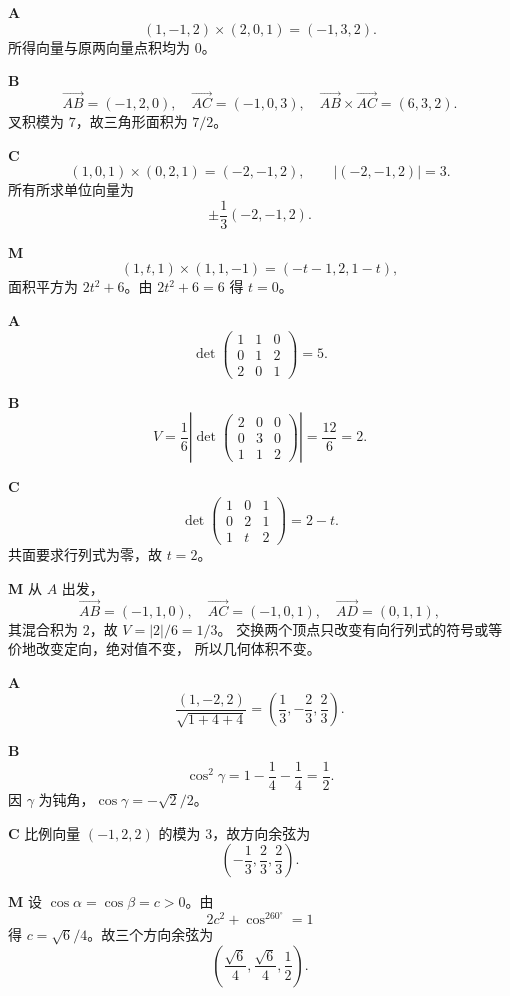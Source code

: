\begin{solutionBox}
\textbf{A}\quad
\[
(1,-1,2)\times(2,0,1)=(-1,3,2).
\]
所得向量与原两向量点积均为 \(0\)。

\textbf{B}\quad
\[
\overrightarrow{AB}=(-1,2,0),\quad
\overrightarrow{AC}=(-1,0,3),\quad
\overrightarrow{AB}\times\overrightarrow{AC}=(6,3,2).
\]
叉积模为 \(7\)，故三角形面积为 \(7/2\)。

\textbf{C}\quad
\[
(1,0,1)\times(0,2,1)=(-2,-1,2),\qquad |(-2,-1,2)|=3.
\]
所有所求单位向量为
\[
\pm\frac13(-2,-1,2).
\]

\textbf{M}\quad
\[
(1,t,1)\times(1,1,-1)=(-t-1,2,1-t),
\]
面积平方为 \(2t^2+6\)。由 \(2t^2+6=6\) 得 \(t=0\)。
\end{solutionBox}

\begin{solutionBox}
\textbf{A}\quad
\[
\det\begin{pmatrix}1&1&0\\0&1&2\\2&0&1\end{pmatrix}=5.
\]

\textbf{B}\quad
\[
V=\frac16\left|
\det\begin{pmatrix}2&0&0\\0&3&0\\1&1&2\end{pmatrix}\right|
=\frac{12}{6}=2.
\]

\textbf{C}\quad
\[
\det\begin{pmatrix}1&0&1\\0&2&1\\1&t&2\end{pmatrix}
=2-t.
\]
共面要求行列式为零，故 \(t=2\)。

\textbf{M}\quad
从 \(A\) 出发，
\[
\overrightarrow{AB}=(-1,1,0),\quad
\overrightarrow{AC}=(-1,0,1),\quad
\overrightarrow{AD}=(0,1,1),
\]
其混合积为 \(2\)，故 \(V=|2|/6=1/3\)。
交换两个顶点只改变有向行列式的符号或等价地改变定向，绝对值不变，
所以几何体积不变。
\end{solutionBox}

\begin{solutionBox}
\textbf{A}\quad
\[
\frac{(1,-2,2)}{\sqrt{1+4+4}}
=\left(\frac13,-\frac23,\frac23\right).
\]

\textbf{B}\quad
\[
\cos^2\gamma=1-\frac14-\frac14=\frac12.
\]
因 \(\gamma\) 为钝角，\(\cos\gamma=-\sqrt2/2\)。

\textbf{C}\quad
比例向量 \((-1,2,2)\) 的模为 \(3\)，故方向余弦为
\[
\left(-\frac13,\frac23,\frac23\right).
\]

\textbf{M}\quad
设 \(\cos\alpha=\cos\beta=c>0\)。由
\[
2c^2+\cos^260^\circ=1
\]
得 \(c=\sqrt6/4\)。故三个方向余弦为
\[
\left(\frac{\sqrt6}{4},\frac{\sqrt6}{4},\frac12\right).
\]
\end{solutionBox}


